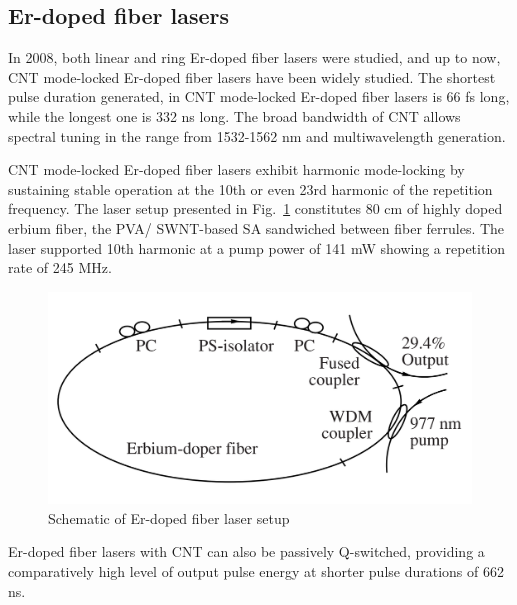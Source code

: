 \documentclass{phyasgn}\usepackage{nag}
\newcommand{\figref}[1]{Fig.~\ref{#1}}
\begin{document}
\subsection{Er-doped fiber lasers}
In 2008, both linear and ring Er-doped fiber lasers were studied\cite{liu2008passively}, and up to now, CNT mode-locked Er-doped fiber lasers have been widely studied. The shortest pulse duration generated, in CNT mode-locked Er-doped fiber lasers is 66 fs long\cite{yu201366}, while the longest one is 332 ns long\cite{ismail2012nanosecond}. The broad bandwidth of CNT allows spectral tuning in the range from 1532-1562 nm and multiwavelength generation\cite{liu2015distributed}.
\par CNT mode-locked Er-doped fiber lasers exhibit harmonic mode-locking by sustaining stable operation at the 10th or even 23rd harmonic of the repetition frequency\cite{liu2008passively}. The laser setup presented in \figref{13} constitutes 80 cm of highly doped erbium fiber, the PVA/ SWNT-based SA sandwiched between fiber ferrules. The laser supported 10th harmonic at a pump power of 141 mW showing a repetition rate of 245 MHz\cite{liu2008passively}. 
\begin{figure}[!h]
	\centering
	\includegraphics[width=.9\linewidth]{pic/13.png}
	\caption[Band structures]{Schematic of Er-doped fiber laser setup\cite{liu2008passively}}
	\label{13}
	\end{figure}
\par Er-doped fiber lasers with CNT can also be passively Q-switched, providing a comparatively high level of output pulse energy at shorter pulse durations of 662 ns\cite{dong2011short}.
\end{document}
